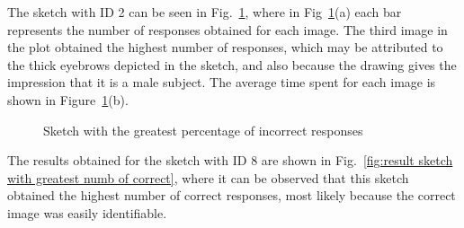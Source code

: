 \noindent The sketch with ID \num{2} can be seen in Fig.~\ref{fig:result sketch with greatest numb of incorrect}, where in Fig~\ref{fig:result sketch with greatest numb of incorrect}(a) each bar represents the number of responses obtained for each image. The third image in the plot obtained the highest number of responses, which may be attributed to the thick eyebrows depicted in the sketch, and also because the drawing gives the impression that it is a male subject.
The average time spent for each image is shown in Figure~\ref{fig:result sketch with greatest numb of incorrect}(b).
\begin{figure}[!ht]
    \centering
     \quad
    \caption{Sketch with the greatest percentage of incorrect responses}
    \label{fig:result sketch with greatest numb of incorrect}
\end{figure}

%
\noindent The results obtained for the sketch with ID \num{8} are shown in Fig.~\ref{fig:result sketch with greatest numb of correct}, where it can be observed that this sketch obtained the highest number of correct responses, most likely because the correct image was easily identifiable.

